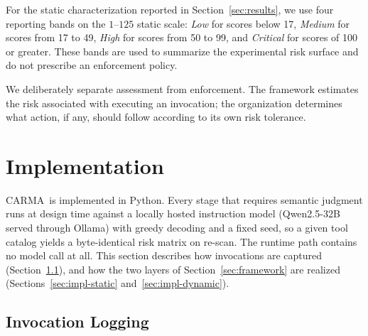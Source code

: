 \documentclass[sigconf]{acmart}
\newcommand{\frameworkname}{\textsc{CARMA}}
\begin{document}
For the static characterization reported in
Section~\ref{sec:results}, we use four reporting bands on the $1$--$125$
static scale: \emph{Low} for scores below 17, \emph{Medium} for scores from
17 to 49, \emph{High} for scores from 50 to 99, and \emph{Critical} for
scores of 100 or greater. These bands are used to summarize the experimental
risk surface and do not prescribe an enforcement policy.

We deliberately separate assessment from enforcement. The framework estimates
the risk associated with executing an invocation; the organization determines
what action, if any, should follow according to its own risk tolerance.




%
%

\section{Implementation}
\label{sec:implementation}

\frameworkname\ is implemented in Python. Every stage that requires semantic
judgment runs at design time against a locally hosted instruction model
(Qwen2.5-32B served through Ollama) with greedy decoding and a fixed seed, so a
given tool catalog yields a byte-identical risk matrix on re-scan. The runtime
path contains no model call at all. This section describes how invocations are
captured (Section~\ref{sec:impl-logging}), and how the two layers of
Section~\ref{sec:framework} are realized
(Sections~\ref{sec:impl-static} and~\ref{sec:impl-dynamic}).


\subsection{Invocation Logging}
\label{sec:impl-logging}
\end{document}
